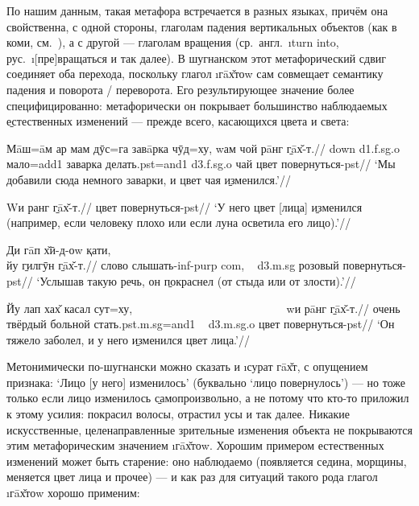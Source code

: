 По нашим данным, такая метафора встречается в разных языках, причём она свойственна, с одной стороны, глаголам падения вертикальных объектов (как в коми, см.~\parencite[93]{kashkin2017}), а с другой — глаголам вращения (ср.~англ.~\i{turn into}, рус.~\i{[пре]вращаться} и так далее). В шугнанском этот метафорический сдвиг соединяет оба перехода, поскольку глагол \i{гāх̌тоw} сам совмещает семантику падения и поворота / переворота. Его результирующее значение более специфицированно: метафорически он покрывает большинство наблюдаемых \b{естественных} изменений — прежде всего, касающихся цвета и света:

\begingl
\gla Мāш=āм ар мам дӯс=га завāрка чӯд=ху, wам чой рāнг \b{гāх̌-т}.//
 {\sc down} {\sc d1.f.sg.o} мало={\sc add1} заварка делать.{\sc pst=and1} {\sc d3.f.sg.o} чай цвет повернуться-{\sc pst}//
\glft ‘Мы добавили сюда немного заварки, и цвет чая \b{изменился}.’//
\endgl \xe

\begingl
\gla Wи ранг \b{гāх̌-т}.//
 цвет повернуться-{\sc pst}//
\glft ‘У него цвет [лица] \b{изменился} (например, если человеку плохо или если луна осветила его лицо).’//
\endgl \xe

\begingl
\gla Ди гāп х̌ӣ-д-оw қати, ~~~~~~~~~~~~~~~~~~~~~~~~~~~~~~~~~~~~~~~~~~~~~~~~~~~~ йу \b{гилгӯн} \b{гāх̌-т}.//
 слово слышать-{\sc inf-purp} {\sc com}, ~ {\sc d3.m.sg} розовый повернуться-{\sc pst}//
\glft ‘Услышав такую речь, он \b{покраснел} (от стыда или от злости).’//
\endgl \xe

\begingl
\gla Йу лап хах̌ касал сут=ху, ~~~~~~~~~~~~~~~~~~~~~~~~~~ wи рāнг \b{гāх̌-т}.//
 очень твёрдый больной стать.{\sc pst.m.sg=and1} ~ {\sc d3.m.sg.o} цвет повернуться-{\sc pst}//
\glft ‘Он тяжело заболел, и у него \b{изменился} цвет лица.’//
\endgl \xe

Метонимически по-шугнански можно сказать и \i{сурат гāх̌т}, с опущением признака: ‘Лицо [у него] изменилось’ (буквально ‘лицо повернулось’) — но тоже только если лицо изменилось \b{самопроизвольно}, а не потому что кто-то приложил к этому усилия: покрасил волосы, отрастил усы и так далее. Никакие искусственные, целенаправленные зрительные изменения объекта не покрываются этим метафорическим значением \i{гāх̌тоw}. Хорошим примером естественных изменений может быть старение: оно наблюдаемо (появляется седина, морщины, меняется цвет лица и прочее) — и как раз для ситуаций такого рода глагол \i{гāх̌тоw} хорошо применим:

